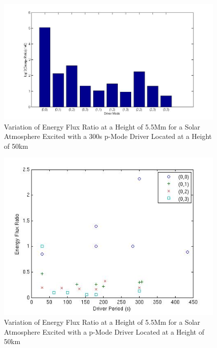 \documentclass[final,1p]{elsarticle}
\begin{document}
\begin{figure}[h]
\includegraphics[scale=0.5]{imagesn/ratio_varoverdrve_eflux_vperiod_forallmodes_300s_5p5Mm.jpg}
\caption{Variation of Energy Flux Ratio at a Height of 5.5Mm for a Solar Atmosphere Excited with a 300s p-Mode Driver Located at a Height of 50km}
\end{figure}

\clearpage


\begin{figure}[h]
\includegraphics[scale=0.6]{imagesn/ratio_varoverconst_eflux_vperiod_for modes_5p5Mm.jpg}
\caption{Variation of Energy Flux Ratio at a Height of 5.5Mm for a Solar Atmosphere Excited with a p-Mode Driver Located at a Height of 50km}
\end{figure}
\end{document}
